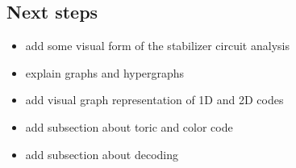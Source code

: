 \subsection{Next steps}
\begin{itemize}
    \item add some visual form of the stabilizer circuit analysis
    \item explain graphs and hypergraphs
    \item add visual graph representation of 1D and 2D codes
    \item add subsection about toric and color code
    \item add subsection about decoding 
\end{itemize}